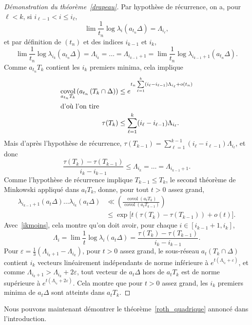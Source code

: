 \documentclass[AHL,Unicode,longabstracts,francais,published]{cedram}
\DeclareMathOperator{\covol}{covol}
\newcommand{\eps}{\varepsilon}
\begin{document}
\begin{proof}[Démonstration du théorème~\ref{drapeau}]
Par hypothèse de récurrence, on a, pour $\ell<k$, si $i_{\ell-1}<i\leq i_\ell$,
\[
\lim\frac{1}{t_n}\log\lambda_i\left(a_{t_n}\Delta\right)=\Lambda_{i_\ell},
\]
et par définition de $(t_n)$ et des indices $i_{k-1}$ et $i_k$,
\[
\lim\frac{1}{t_n}\log\lambda_{i_k}(a_{t_n}\Delta) = \Lambda_{i_k} =\dots= \Lambda_{i_{k-1}+1}=\lim\frac{1}{t_n}\log\lambda_{i_{k-1}+1}\left(a_{t_n}\Delta\right).
\]
Comme $a_{t_n}T_k$ contient les $i_k$ premiers minima, cela implique
\begin{align*}
\covol_{a_{t_n}T_k}\left(a_{t_n}\left(T_k\cap\Delta\right)\right) &\leq e^{t_n\sum\limits_{\ell=1}^k\left(i_\ell-i_{\ell-1}\right)\Lambda_{i_\ell}+o(t_n)}
\\
\intertext{d'où l'on tire}
\tau(T_k) &\leq \sum_{\ell=1}^k (i_\ell-i_{\ell-1})\Lambda_{i_\ell}.
\end{align*}
Mais d'après l'hypothèse de récurrence, $\tau(T_{k-1}) = \sum_{\ell=1}^{k-1} (i_\ell-i_{\ell-1})\Lambda_{i_\ell}$, et donc
\begin{equation}\label{ikmoins}
\frac{\tau(T_k)-\tau(T_{k-1})}{i_k-i_{k-1}} \leq \Lambda_{i_k}=\dots=\Lambda_{i_{k-1}+1}.
\end{equation}
Comme l'hypothèse de récurrence implique $T_{k-1}\leq T_k$, le second théorème de Minkowski appliqué dans $a_tT_k$, donne, pour tout $t>0$ assez grand,
\begin{align*}
\lambda_{i_{k-1}+1}\left(a_t\Delta\right) \dots \lambda_{i_k}(a_t\Delta) & \ll \left(\frac{\covol\left(a_{t}T_k\right)}{\covol\left(a_{t}T_{k-1}\right)}\right)\\
& \leq \exp\big[t\left(\tau(T_k)-\tau\left(T_{k-1}\right)\right)+o(t)\big].
\end{align*}
Avec~\eqref{ikmoins}, cela montre qu'on doit avoir, pour chaque $i\in\left[i_{k-1}+1,i_k\right]$,
\[
\Lambda_i=\lim\frac{1}{t}\log\lambda_i(a_t\Delta)=\frac{\tau(T_k)-\tau(T_{k-1})}{i_k-i_{k-1}}.
\]
Pour $\eps=\tfrac{1}{3}(\Lambda_{i_k+1}-\Lambda_{i_k})$, pour $t>0$ assez grand, le sous-réseau $a_t(T_k\cap\Delta)$ contient $i_k$ vecteurs linéairement indépendants de norme inférieure à $e^{t(\Lambda_{i_k}+\eps)}$, et comme $\Lambda_{i_k+1}>\Lambda_{i_k}+2\eps$, tout vecteur de $a_t\Delta$ hors de $a_tT_k$ est de norme supérieure à $e^{t(\Lambda_{i_k}+2\eps)}$. Cela montre que pour $t>0$ assez grand, les $i_k$ premiers minima de $a_t\Delta$ sont atteints dans $a_tT_k$.
\end{proof}

Nous pouvons maintenant démontrer le théorème~\ref{roth_quadrique} annoncé dans l'introduction.
\end{document}
